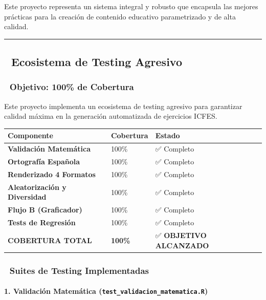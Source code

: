 \documentclass[
]{article}
\begin{document}
Este proyecto representa un sistema integral y robusto que encapsula las
mejores prácticas para la creación de contenido educativo parametrizado
y de alta calidad.

\begin{center}\rule{0.5\linewidth}{0.5pt}\end{center}

\subsection{\texorpdfstring{🧪 \textbf{Ecosistema de Testing
Agresivo}}{🧪 Ecosistema de Testing Agresivo}}\label{ecosistema-de-testing-agresivo}

\subsubsection{🎯 Objetivo: 100\% de
Cobertura}\label{objetivo-100-de-cobertura}

Este proyecto implementa un ecosistema de testing agresivo para
garantizar calidad máxima en la generación automatizada de ejercicios
ICFES.

\begin{longtable}[]{@{}lll@{}}
\toprule\noalign{}
Componente & Cobertura & Estado \\
\midrule\noalign{}
\endhead
\bottomrule\noalign{}
\endlastfoot
\textbf{Validación Matemática} & 100\% & ✅ Completo \\
\textbf{Ortografía Española} & 100\% & ✅ Completo \\
\textbf{Renderizado 4 Formatos} & 100\% & ✅ Completo \\
\textbf{Aleatorización y Diversidad} & 100\% & ✅ Completo \\
\textbf{Flujo B (Graficador)} & 100\% & ✅ Completo \\
\textbf{Tests de Regresión} & 100\% & ✅ Completo \\
\textbf{COBERTURA TOTAL} & \textbf{100\%} & ✅ \textbf{OBJETIVO
ALCANZADO} \\
\end{longtable}

\subsubsection{🧪 Suites de Testing
Implementadas}\label{suites-de-testing-implementadas}

\paragraph{\texorpdfstring{1. \textbf{Validación Matemática}
(\texttt{test\_validacion\_matematica.R})}{1. Validación Matemática (test\_validacion\_matematica.R)}}\label{validaciuxf3n-matemuxe1tica-test_validacion_matematica.r}
\end{document}

